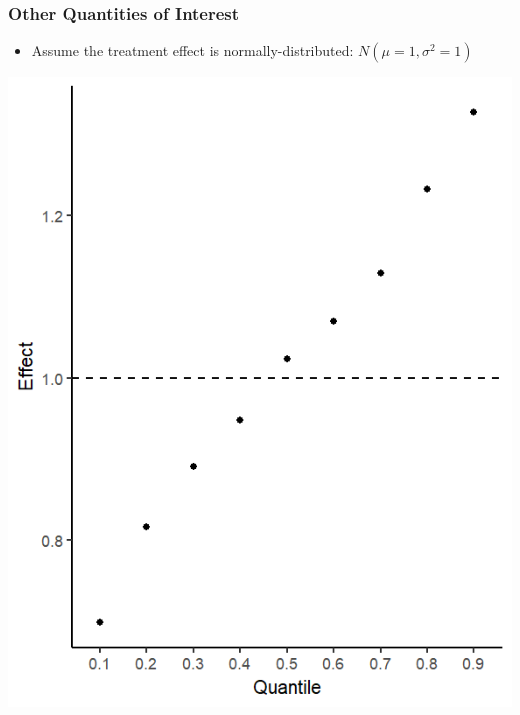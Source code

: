 \documentclass[xcolor=x11names,compress]{beamer}\usepackage[]{graphicx}\usepackage[]{color}
\makeatletter
\def\maxwidth{ %
  \ifdim\Gin@nat@width>\linewidth
    \linewidth
  \else
    \Gin@nat@width
  \fi
}
\newenvironment{knitrout}{}{} %
\renewcommand{\(}{\begin{columns}}
\renewcommand{\)}{\end{columns}}
\newcommand{\<}[1]{\begin{column}{#1}}
\renewcommand{\>}{\end{column}}
\makeatother
\begin{document}
\begin{frame}
\frametitle{Other Quantities of Interest}
\begin{multicols}{2}
\begin{itemize}
\item Assume the treatment effect is normally-distributed: $N(\mu=1,\sigma^2=1)$
\end{itemize}
\pause
\columnbreak
\begin{knitrout}
\color{fgcolor}
\includegraphics[width=\maxwidth]{figure/quant_reg-1} 

\end{knitrout}
\end{multicols}
\end{frame}
\end{document}
